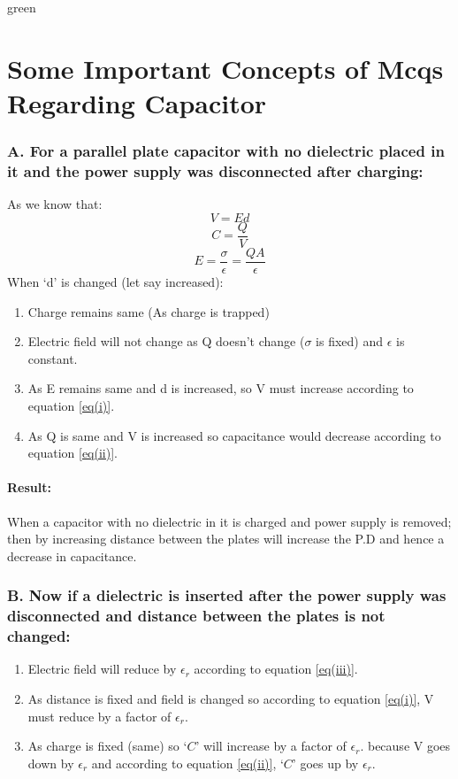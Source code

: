 \begin{mybox}{green}{}
  \section*{Some Important Concepts of Mcqs Regarding Capacitor} 
  \subsubsection*{A. For a parallel plate capacitor with no dielectric
  placed in it and the power supply was disconnected after charging:}
  As we know that:
  \begin{equation}\label{eq(i)}
    V = Ed \tag{i}
  \end{equation}
  \begin{equation}\label{eq(ii)}
    C = \frac{Q}{V} \tag{ii}
  \end{equation}
  \begin{equation}\label{eq(iii)}
    E = \frac{\sigma}{\epsilon} = \frac{QA}{\epsilon} \tag{iii}
  \end{equation}
  When `d' is changed (let say increased):
  \begin{enumerate}[label = $\square$]
    \item Charge remains same (As charge is trapped) 
    \item Electric field will not change as Q doesn't change ($\sigma$ is fixed)
    and $\epsilon$ is constant.
    \item As E remains same and d is increased, so V must increase according to equation \ref{eq(i)}.
    \item As Q is same and V is increased so capacitance would decrease according to equation \ref{eq(ii)}.    
  \end{enumerate}
  \paragraph{Result:}
  When a capacitor with no dielectric in it is charged and power supply
  is removed; then by increasing distance between the
  plates will increase the P.D and hence a decrease in capacitance.

  \subsubsection*{B. Now if a dielectric is inserted after the power supply was disconnected
  and distance between the plates is not changed:}
  \begin{enumerate}[label = $\square$]
    \item Electric field will reduce by $\epsilon_{r}$ according to equation \ref{eq(iii)}.
    \item As distance is fixed and field is changed so according to equation \ref{eq(i)},
    V must reduce by a factor of $\epsilon_{r}$.
    \item As charge is fixed (same) so `$C$' will increase by a factor of $\epsilon_{r}$.
    because V goes down by $\epsilon_{r}$ and according to equation \ref{eq(ii)}, `$C$'
    goes up by $\epsilon_{r}$.
  \end{enumerate}

\end{mybox}
